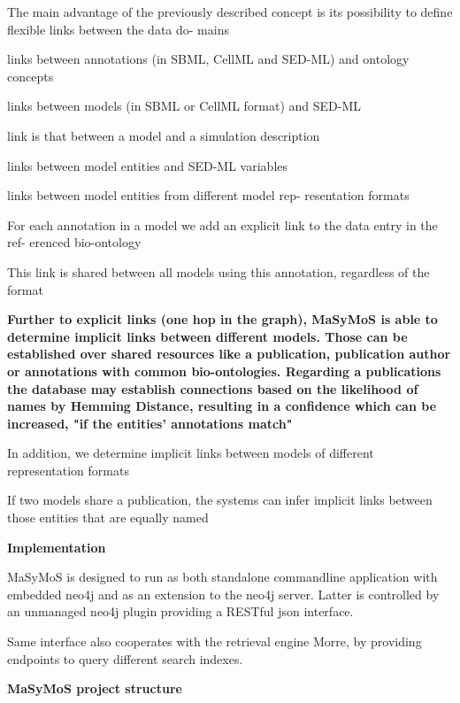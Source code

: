 \par The main advantage of the previously described concept is
its possibility to define flexible links between the data do-
mains
\par  links between annotations (in SBML, CellML and
SED-ML) and ontology concepts
\par links between models (in SBML or CellML format) and
SED-ML
\par link is that between a model and a
simulation description
\par links between model entities and SED-ML variables
\par  links between model entities from different model rep-
resentation formats
\par For each annotation in
a model we add an explicit link to the data entry in the ref-
erenced bio-ontology
\par This link is shared between all models using this annotation, regardless of the format\par \textbf{Further to explicit links (one hop in the graph), MaSyMoS is able to determine implicit links between different models. Those can be established over shared resources like a publication, publication author or annotations with common bio-ontologies.
Regarding a publications the database may establish connections based on the likelihood of names by Hemming Distance, resulting in a confidence which can be increased, "if the entities' annotations match"}

\par In addition, we determine implicit links between
models of different representation formats
\par If two models share
a publication, the systems can infer implicit links between
those entities that are equally named\par \textbf{Implementation}

\par MaSyMoS is designed to run as both standalone commandline application with embedded neo4j and as an extension to the neo4j server. Latter is controlled by an unmanaged neo4j plugin providing a RESTful json interface.
\par Same interface also cooperates with the retrieval engine Morre, by providing endpoints to query different search indexes.\par \textbf{MaSyMoS project structure}

